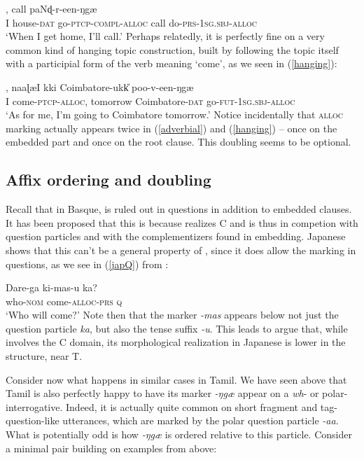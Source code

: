 \documentclass[output=paper, modfonts, nonflat]{langsci/langscibook}
\begin{document}
\ea\label{adverbial},
call pa{\color{red}N}ɖ-r-een-ŋgæ\\ 
I house-\textsc{dat}{} go-\textsc{ptcp}-\textsc{compl}-\textsc{alloc}{} call
do-\textsc{prs}-\textsc{1sg}.\textsc{sbj}-\textsc{alloc}\\ 
\glt `When I get home, I'll call.'
\z
%
Perhaps relatedly, it is perfectly fine on a very common kind of
hanging topic construction, built by following the topic itself with a
participial form of the verb meaning `come', as we seen in
(\ref{hanging}):

\ea\label{hanging}, naaɭæI kki
Coimbatore-ukk\U{} poo-v-een-ŋgæ\\
I come-\textsc{ptcp}-\textsc{alloc}, tomorrow Coimbatore-\textsc{dat}{}
go-\textsc{fut}-\textsc{1sg}.\textsc{sbj}-\textsc{alloc}\\ 
\glt `As for me, I'm going to Coimbatore tomorrow.'
\z
%
Notice incidentally that \textsc{alloc}{} marking actually appears twice in
(\ref{adverbial}) and (\ref{hanging}) -- once on the embedded part
and once on the root clause. This doubling seems to be optional. 


\subsection{Affix ordering and doubling}
\label{sec:orderdoub}


Recall that in Basque, \allagr{} is ruled out in questions in addition
to embedded clauses. It has been proposed that this is because
\allagr{} realizes C and is thus in competion with question particles
and with the complementizers found in embedding.  Japanese shows that
this can't be a general property of \allagr, since it does allow the
marking in questions, as we see in (\ref{japQ}) from
\citet{miyagawa:2017}:

\ea\label{japQ}\gll Dare-ga ki-mas-u ka?\\
who-\textsc{nom}{} come-\textsc{alloc}-\textsc{prs}{} \textsc{q}\\
\glt `Who will come?'
\z
%
Note then that the \allagr{} marker \textit{-mas} appears below not
just the question particle \textit{ka}, but also the tense suffix
\textit{-u}. This leads \citet{miyagawa:2017} to argue that, while
\allagr{} involves the C domain, its morphological realization in
Japanese is lower in the structure, near T.

Consider now what happens in similar cases in Tamil.  We have seen
above that Tamil is also perfectly happy to have its \allagr{} marker
\textit{-ŋgæ} appear on a \textit{wh}- or polar-interrogative.
Indeed, it is actually quite common on short fragment and
tag-question-like utterances, which are marked by the polar question
particle \textit{-aa}.  What is potentially odd is how \textit{-ŋgæ}
is ordered relative to this particle.  Consider a minimal pair
building on examples from above:
\end{document}
